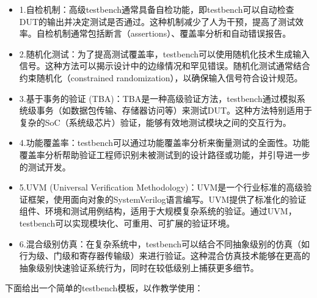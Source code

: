\begin{itemize}
\item
  1.自检机制：高级testbench通常具备自检功能，即testbench可以自动检查DUT的输出并决定测试是否通过。这种机制减少了人为干预，提高了测试效率。自检机制通常包括断言（assertions）、覆盖率分析和自动错误报告。
\item
  2.随机化测试：为了提高测试覆盖率，testbench可以使用随机化技术生成输入信号。这种方法可以揭示设计中的边缘情况和罕见错误。随机化测试通常结合约束随机化（constrained
  randomization），以确保输入信号符合设计规范。
\item
  3.基于事务的验证
  (TBA)：TBA是一种高级验证方法，testbench通过模拟系统级事务（如数据包传输、存储器访问等）来测试DUT。这种方法特别适用于复杂的SoC（系统级芯片）验证，能够有效地测试模块之间的交互行为。
\item
  4.功能覆盖率：testbench可以通过功能覆盖率分析来衡量测试的全面性。功能覆盖率分析帮助验证工程师识别未被测试到的设计路径或功能，并引导进一步的测试开发。
\item
  5.UVM (Universal Verification
  Methodology)：UVM是一个行业标准的高级验证框架，使用面向对象的SystemVerilog语言编写。UVM提供了标准化的验证组件、环境和测试用例结构，适用于大规模复杂系统的验证。通过UVM，testbench可以实现模块化、可重用、可扩展的验证环境。
\item
  6.混合级别仿真：在复杂系统中，testbench可以结合不同抽象级别的仿真（如行为级、门级和寄存器传输级）来进行验证。这种混合仿真技术能够在更高的抽象级别快速验证系统行为，同时在较低级别上捕获更多细节。
\end{itemize}

下面给出一个简单的testbench模板，以作教学使用：

